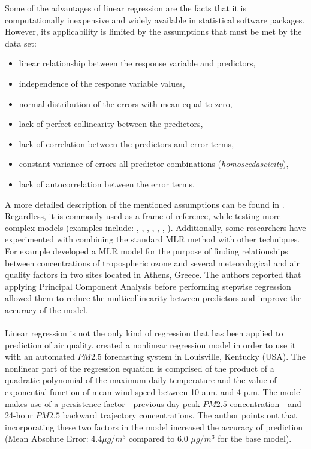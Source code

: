 Some of the advantages of linear regression are the facts that it is computationally inexpensive and widely available in statistical software packages. However, its applicability is limited by the assumptions that must be met by the data set:
\begin{itemize}
    \item linear relationship between the response variable and predictors,
    \item independence of the response variable values,
    \item normal distribution of the errors with mean equal to zero,
    \item lack of perfect collinearity between the predictors,
    \item lack of correlation between the predictors and error terms,
    \item constant variance of errors all predictor combinations     (\textit{homoscedascicity}),
    \item lack of autocorrelation between the error terms.
\end{itemize}
A more detailed description of the mentioned assumptions can be found in \cite{HOFFMAN2008}. Regardless, it is commonly used as a frame of reference, while testing more complex models (examples include: \cite{GARDNER1999709}, \cite{AGIRREBASURKO2006430}, \cite{VLACHOGIANNI20111559}, \cite{PEREZ20024555}, \cite{BIANCOFIORE2017652}, \cite{DIAZROBLES20088331}, \cite{CATALANO201669}). Additionally, some researchers have experimented with combining the standard MLR method with other techniques. For example \cite{Paschalidou2009} developed a MLR model for the purpose of finding relationships between concentrations of tropospheric ozone and several meteorological and air quality factors in two sites located in Athens, Greece. The authors reported that applying Principal Component Analysis before performing stepwise regression allowed them to reduce the multicollinearity between predictors and improve the accuracy of the model.
\\\\
Linear regression is not the only kind of regression that has been applied to prediction of air quality. \cite{COBOURN20103015} created a nonlinear regression model in order to use it with an automated $PM2.5$ forecasting system in Louisville, Kentucky (USA). The nonlinear part of the regression equation is comprised of the product of a quadratic polynomial of the maximum daily temperature and the value of exponential function of mean wind speed between 10 a.m. and 4 p.m. The model makes use of a persistence factor - previous day peak $PM2.5$ concentration - and 24-hour $PM2.5$ backward trajectory concentrations. The author points out that incorporating these two factors in the model increased the accuracy of prediction (Mean Absolute Error: 4.4$\mu g/m^3$ compared to 6.0 $\mu g/m^3$ for the base model).
